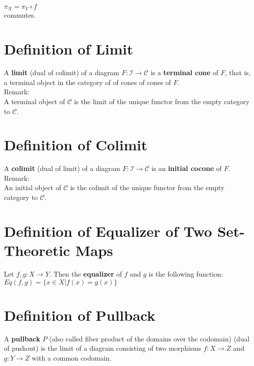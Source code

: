 \documentclass[a4paper, twoside, english, 11pt]{book}
\newcommand{\C}{\mathcal C}
\newcommand{\I}{\mathcal I}
\begin{document}
$\pi_X = \pi_Y \circ f$ \\

\noindent
commutes.



\section{Definition of Limit}

A \textbf{limit} (dual of colimit) of a diagram $F : \I \rightarrow \C$ is a \textbf{terminal cone} of $F$, that is, a terminal object in the category of of cones of cones of $F$. \\

\noindent
Remark: \\
A terminal object of $\C$ is the limit of the unique functor from the empty category to $\C$.



\section{Definition of Colimit}

A \textbf{colimit} (dual of limit) of a diagram $F : \I \rightarrow \C$ is an \textbf{initial cocone} of $F$. \\

\noindent
Remark: \\
An initial object of $\C$ is the colimit of the unique functor from the empty category to $\C$.



\section{Definition of Equalizer of Two Set-Theoretic Maps}

Let $f, g : X \rightarrow Y$. Then the \textbf{equalizer} of $f$ and $g$ is the following function: \\

$Eq(f, g) = \{ x \in X | f(x) = g(x) \}$



\section{Definition of Pullback}

A \textbf{pullback} $P$ (also called fiber product of the domains over the codomain) (dual of pushout) is the limit of a diagram consisting of two morphisms $f : X \rightarrow Z$ and $g : Y \rightarrow Z$ with a common codomain. \\
\end{document}
